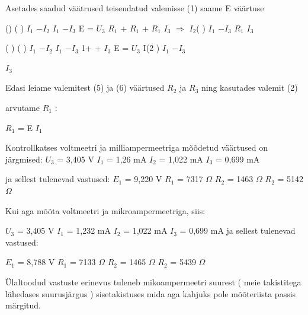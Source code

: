 Asetades saadud väätrused teisendatud valemisse (1) saame E väärtuse

() ( ) $I_1$ $-$$I_2$ $I_1$ $-$$I_3$ E = $U_3$ $R_1$ + $R_1$ + $R_1$ $I_3$ $\Rightarrow$ $I_2$( ) $I_1$ $-$$I_3$ $R_1$ $I_3$

( ) ( ) $I_1$ $-$$I_2$ $I_1$ $-$$I_3$ 1+ + $I_3$ E = $U_3$ I(2 ) $I_1$ $-$$I_3$

$I_3$

Edasi leiame valemitest (5) ja (6) väärtused $R_2$ ja $R_3$ ning kasutades valemit (2)

arvutame $R_1$ :

$R_1$ = E $I_1$

Kontrollkatses voltmeetri ja milliampermeetriga mõõdetud väärtused on järgmised: $U_3$ = 3,405 V $I_1$ = 1,26 mA $I_2$ = 1,022 mA $I_3$ = 0,699 mA

ja sellest tulenevad vastused: $E_1$ = 9,220 V $R_1$ = 7317 $\Omega$ $R_2$ = 1463 $\Omega$ $R_2$ = 5142 $\Omega$

Kui aga mõõta voltmeetri ja mikroampermeetriga, siis:

$U_3$ = 3,405 V $I_1$ = 1,232 mA $I_2$ = 1,022 mA $I_3$ = 0,699 mA ja sellest tulenevad vastused:

$E_1$ = 8,788 V $R_1$ = 7133 $\Omega$ $R_2$ = 1465 $\Omega$ $R_2$ = 5439 $\Omega$

Ülaltoodud vastuste erinevus tuleneb mikoampermeetri suurest ( meie takistitega lähedases suurusjärgus ) sisetakistuses mida aga kahjuks pole mõõteriista passis märgitud.
\probend

